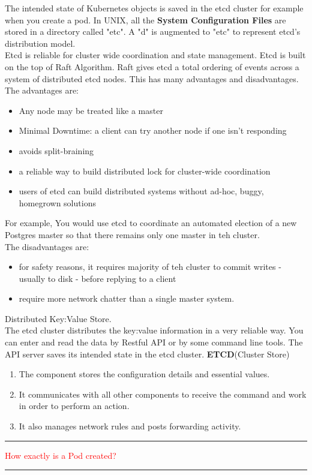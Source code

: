 \documentclass{article}
\begin{document}
The intended state of Kubernetes objects is saved in the etcd cluster for example when you create a pod.  In UNIX, all the \textbf{System Configuration Files} are stored in a directory called "etc". A "d" is augmented to "etc" to represent etcd's distribution model.\\
Etcd is reliable for cluster wide coordination and state management. Etcd is built on the top of Raft Algorithm. Raft gives etcd a total ordering of events across a system of distributed etcd nodes. This has many advantages and disadvantages.\\
The advantages are:
\begin{itemize}
    \item Any node may be treated like a master
    \item Minimal Downtime: a client can try another node if one isn't responding
    \item avoids split-braining
    \item a reliable way to build distributed lock for cluster-wide coordination
    \item users of etcd can build distributed systems without ad-hoc, buggy, homegrown solutions
\end{itemize}
For example, You would use etcd to coordinate an automated election of a new Postgres master so that there remains only one master in teh cluster. \\
The disadvantages are:
\begin{itemize}
    \item for safety reasons, it requires majority of teh cluster to commit writes - usually to disk - before replying to a client
    \item require more network chatter than a single master system. 
\end{itemize}
    
Distributed Key:Value Store. \\
The etcd cluster distributes the key:value information in a very reliable way. You can enter and read the data by Restful API or by some command line tools. The API server saves its intended state in the etcd cluster.
\textbf{ETCD}(Cluster Store)
\begin{enumerate}
    \item The component stores the configuration details and essential values.
    \item It communicates with all other components to receive the command and work in order to perform an action.
    \item It also manages network rules and posts forwarding activity.
\end{enumerate}
\noindent
{\color{red} \rule{\linewidth}{0.5mm}}
\textcolor{red}{How exactly is a Pod created?} \\
\noindent
{\color{red} \rule{\linewidth}{0.5mm}}
\end{document}
